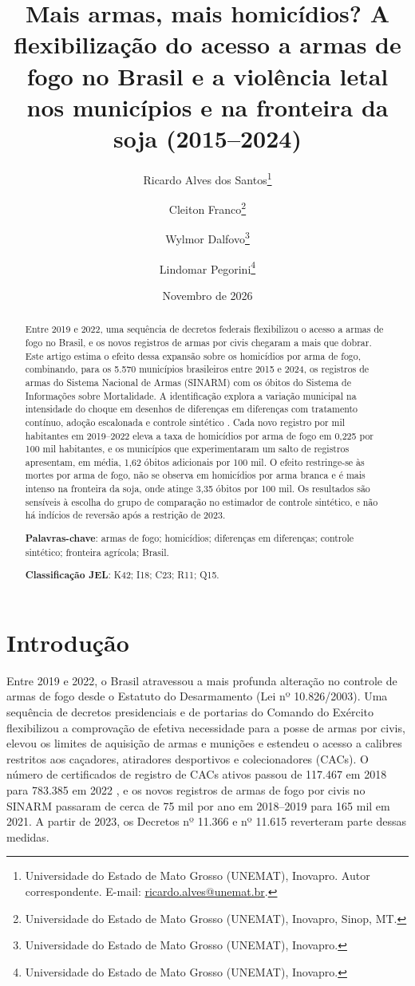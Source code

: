 \documentclass[11pt,a4paper]{article}
\title{\textbf{Mais armas, mais homicídios? A flexibilização do acesso a armas de fogo no Brasil e a violência letal nos municípios e na fronteira da soja (2015--2024)}}
\author{Ricardo Alves dos Santos\thanks{Universidade do Estado de Mato Grosso (UNEMAT), Inovapro. Autor correspondente. E-mail: \href{mailto:ricardo.alves@unemat.br}{ricardo.alves@unemat.br}.}
\and Cleiton Franco\thanks{Universidade do Estado de Mato Grosso (UNEMAT), Inovapro, Sinop, MT.}
\and Wylmor Dalfovo\thanks{Universidade do Estado de Mato Grosso (UNEMAT), Inovapro.}
\and Lindomar Pegorini\thanks{Universidade do Estado de Mato Grosso (UNEMAT), Inovapro.}}
\date{Novembro de 2026}
\begin{document}
\maketitle
\thispagestyle{empty}

\begin{abstract}
\noindent Entre 2019 e 2022, uma sequência de decretos federais flexibilizou o acesso a armas de fogo no Brasil, e os novos registros de armas por civis chegaram a mais que dobrar. Este artigo estima o efeito dessa expansão sobre os homicídios por arma de fogo, combinando, para os 5.570 municípios brasileiros entre 2015 e 2024, os registros de armas do Sistema Nacional de Armas (SINARM) com os óbitos do Sistema de Informações sobre Mortalidade. A identificação explora a variação municipal na intensidade do choque em desenhos de diferenças em diferenças com tratamento contínuo, adoção escalonada \citep{callaway2021} e controle sintético \citep{arkhangelsky2021}. Cada novo registro por mil habitantes em 2019--2022 eleva a taxa de homicídios por arma de fogo em 0{,}225 por 100 mil habitantes, e os municípios que experimentaram um salto de registros apresentam, em média, 1{,}62 óbitos adicionais por 100 mil. O efeito restringe-se às mortes por arma de fogo, não se observa em homicídios por arma branca e é mais intenso na fronteira da soja, onde atinge 3{,}35 óbitos por 100 mil. Os resultados são sensíveis à escolha do grupo de comparação no estimador de controle sintético, e não há indícios de reversão após a restrição de 2023.

\vspace{0.6em}
\noindent\textbf{Palavras-chave}: armas de fogo; homicídios; diferenças em diferenças; controle sintético; fronteira agrícola; Brasil.

\noindent\textbf{Classificação JEL}: K42; I18; C23; R11; Q15.
\end{abstract}

\newpage
\setcounter{page}{1}

\section{Introdução}

Entre 2019 e 2022, o Brasil atravessou a mais profunda alteração no controle de armas de fogo desde o Estatuto do Desarmamento (Lei nº 10.826/2003). Uma sequência de decretos presidenciais e de portarias do Comando do Exército flexibilizou a comprovação de efetiva necessidade para a posse de armas por civis, elevou os limites de aquisição de armas e munições e estendeu o acesso a calibres restritos aos caçadores, atiradores desportivos e colecionadores (CACs). O número de certificados de registro de CACs ativos passou de 117.467 em 2018 para 783.385 em 2022 \citep{fbsp2023}, e os novos registros de armas de fogo por civis no SINARM passaram de cerca de 75 mil por ano em 2018--2019 para 165 mil em 2021. A partir de 2023, os Decretos nº 11.366 e nº 11.615 reverteram parte dessas medidas.
\end{document}
